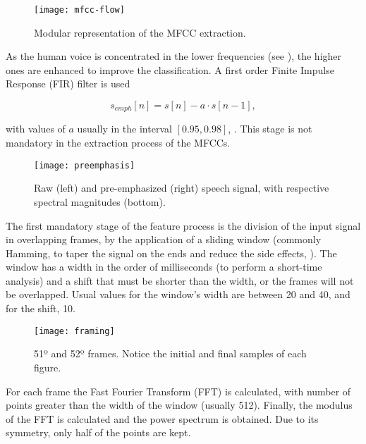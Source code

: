 \begin{figure}[ht]
    \centering
    \texttt{[image: mfcc-flow]}
    \caption{Modular representation of the MFCC extraction.}
    \label{fig:mfcc-flow}
\end{figure}


As the human voice is concentrated in the lower frequencies (see ), the higher ones are enhanced to improve the classification. A first order Finite Impulse Response (FIR) filter is used

\begin{equation}
    s_{emph}[n] = s[n] - a \cdot s[n - 1],
    \label{eq:preemphasis}
\end{equation}

\noindent with values of $a$ usually in the interval $[0.95, 0.98]$, . This stage is not mandatory in the extraction process of the MFCCs.

\begin{figure}[ht]
    \centering
    \texttt{[image: preemphasis]}
    \caption{Raw (left) and pre-emphasized (right) speech signal, with respective spectral magnitudes (bottom).}
    \label{fig:preemphasis}
\end{figure}


The first mandatory stage of the feature process is the division of the input signal in overlapping frames, by the application of a sliding window (commonly Hamming, to taper the signal on the ends and reduce the side effects, ). The window has a width in the order of milliseconds (to perform a short-time analysis) and a shift that must be shorter than the width, or the frames will not be overlapped. Usual values for the window's width are between 20 and 40, and for the shift, 10.

\begin{figure}[ht]
    \centering
    \texttt{[image: framing]}
    \caption{51º and 52º frames. Notice the initial and final samples of each figure.}
    \label{fig:framing}
\end{figure}


For each frame the Fast Fourier Transform (FFT) is calculated, with number of points greater than the width of the window (usually 512). Finally, the modulus of the FFT is calculated and the power spectrum is obtained. Due to its symmetry, only half of the points are kept.

